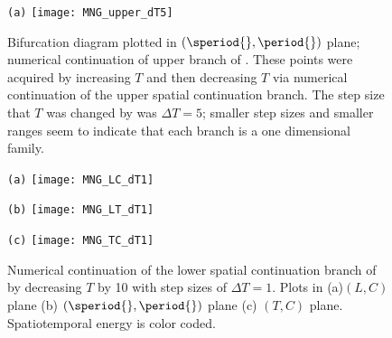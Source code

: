\begin{description}
\begin{figure}
\begin{minipage}[height=.20\textheight]{.8\textwidth}
\centering \small{\texttt{(a)}}
\texttt{[image: MNG\_upper\_dT5]}
\end{minipage}
\caption{ \label{fig:MNG_upper_dT5}
Bifurcation diagram plotted in $(\speriod{},\period{})$ plane; numerical continuation of upper branch of .
These points were acquired by increasing $T$ and then decreasing $T$ via numerical continuation of the upper spatial continuation branch. The step size that $T$ was changed by was $\Delta T = 5$; smaller step sizes and smaller ranges seem to indicate that each branch is a one dimensional family.
}
\end{figure}


\begin{figure}
\begin{minipage}[height=.20\textheight]{.30\textwidth}
\centering \small{\texttt{(a)}}
\texttt{[image: MNG\_LC\_dT1]}
\end{minipage}
\begin{minipage}[height=.20\textheight]{.30\textwidth}
\centering \small{\texttt{(b)}}
\texttt{[image: MNG\_LT\_dT1]}
\end{minipage}
\begin{minipage}[height=.20\textheight]{.30\textwidth}
\centering \small{\texttt{(c)}}
\texttt{[image: MNG\_TC\_dT1]}
\end{minipage}
\caption{ \label{fig:MNG_lower_dT1}
Numerical continuation of the lower spatial continuation branch of
 by decreasing $T$ by 10 with step
sizes of $\Delta T = 1$. Plots in (a)$(L,C)$ plane (b) $(\speriod{},\period{})$ plane
(c) $(T,C)$ plane. Spatiotemporal energy is color coded.
}
\end{figure}


\end{description}
